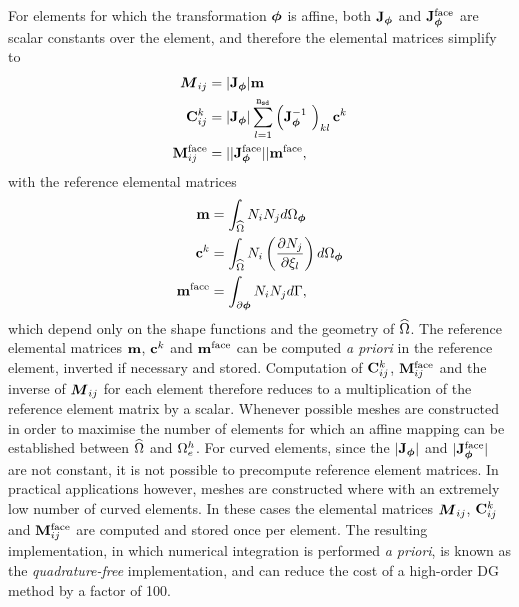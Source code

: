 For elements for which the transformation $\boldsymbol{\phi}$ is affine, both $\mathbf{J}_{\boldsymbol{\phi}}$ and $\mathbf{J}^{\textrm{face}}_{\boldsymbol{\phi}}$ are scalar constants over the element, and therefore the elemental matrices simplify to
\begin{align*}
\boldsymbol{M}_{ij} &= |\mathbf{J}_{\boldsymbol{\phi}}| \mathbf{m} \\
\mathbf{C}^{k}_{ij} &= |\mathbf{J}_{\boldsymbol{\phi}}|
                               \sum_{l=1}^{\texttt{n}_{\texttt{sd}}}
                               \left( 
                               \mathbf{J}_{\boldsymbol{\phi}}^{-1}\
                                \right)_{kl}
                               \mathbf{c}^k \\
\mathbf{M}^{\textrm{face}}_{ij} &= || \mathbf{J}^{\textrm{face}}_{\boldsymbol{\phi}} || \mathbf{m}^{\textrm{face}}
,
\end{align*}
with the reference elemental matrices
\begin{align*}
\mathbf{m} &= \int_{\widehat{\Omega}} N_i N_j d\Omega_{\boldsymbol{\phi}} \\
\mathbf{c}^k &= \int_{\widehat{\Omega}} N_i
                             \left(
                               \frac{\partial N_j}{\partial \xi_{l}}
                             \right)
                             d\Omega_{\boldsymbol{\phi}} \\
\mathbf{m}^{\textrm{face}} &= \int_{\partial \boldsymbol{\phi}} N_i N_j d\Gamma
,
\end{align*}
which depend only on the shape functions and the geometry of $\widehat{\Omega}$. The reference elemental matrices $\mathbf{m}$, $\mathbf{c}^k$ and $\mathbf{m}^{\textrm{face}}$ can be computed \textit{a priori} in the reference element, inverted if necessary and stored. Computation of $\mathbf{C}^{k}_{ij}$, $\mathbf{M}^{\textrm{face}}_{ij}$ and the inverse of $\boldsymbol{M}_{ij}$ for each element therefore reduces to a multiplication of the reference element matrix by a scalar. Whenever possible meshes are constructed in order to maximise the number of elements for which an affine mapping can be established between $\widehat{\Omega}$ and $\Omega_e^{h}$. For curved elements, since the $|\mathbf{J}_{\boldsymbol{\phi}}|$ and $|\mathbf{J}^{\textrm{face}}_{\boldsymbol{\phi}}|$ are not constant, it is not possible to precompute reference element matrices. In practical applications however, meshes are constructed where with an extremely low number of curved elements. In these cases the elemental matrices $\boldsymbol{M}_{ij}$, $\mathbf{C}^{k}_{ij}$ and $\mathbf{M}^{\textrm{face}}_{ij}$ are computed and stored once per element.
The resulting implementation, in which numerical integration is performed \textit{a priori}, is known as the \textit{quadrature-free} implementation\cite{AJ-Atkins-98}, and can reduce the cost of a high-order DG method by a factor of 100\cite{HybridMeshesCEM}.


